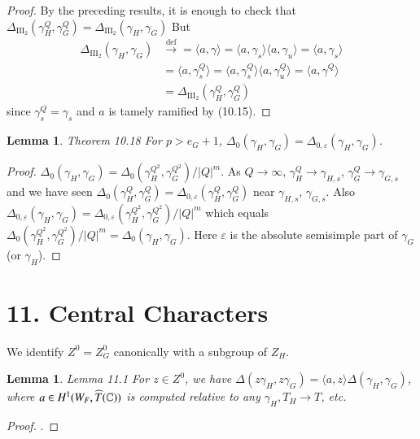 \documentclass[11pt]{amsart}
\theoremstyle{plain}
\newtheorem{lemma}[theorem]{Lemma}
\theoremstyle{definition}
\def\Com{{\Bbb C}}                         %
\def\Def{\overset{\operatorname{def}}\to=}   %
\def\varep{\varepsilon}
\def\hgam{\gamma_H}
\def\ggam{\gamma_G}
\def\LANGLANDSO{21}
\begin{document}
\begin{proof} By the preceding results, it is enough
to check that 
$\Delta_{\text{III}_2}(\gamma_H^Q,\gamma_G^Q)
= \Delta_{\text{III}_2}(\gamma_H,\gamma_G)$
But
$$
\begin{array}{lll}
\Delta_{\text{III}_2}(\gamma_H,\gamma_G)
&\Def
\langle a,\gamma\rangle =\langle a,\gamma_s\rangle
\langle a,\gamma_u\rangle = \langle a,\gamma_s\rangle\\
&=\langle a,\gamma_s^Q\rangle =\langle a,\gamma_s^Q\rangle
\langle a,\gamma_u^Q\rangle = \langle a,\gamma^Q\rangle\\
&=\Delta_{\text{III}_2}(\gamma_H^Q,\gamma_G^Q)
\end{array}
$$
since $\gamma_s^Q=\gamma_s$ and $a$ is tamely ramified by (10.15).
\end{proof}

\begin{lemma}{Theorem 10.18}  For $p > e_G+1$, $\Delta_0(\gamma_H,
\gamma_G) = \Delta_{0,\varep}(	\gamma_H,\gamma_G)$.
\end{lemma}

\begin{proof} $\Delta_0(\gamma_H,\gamma_G) =
{\Delta_0(\gamma_H^{Q^2},\gamma_G^{Q^2})}/{|Q|^m}$.
As $Q\to\infty$, $\gamma_H^Q\to \gamma_{H,s}$,
$\gamma_G^Q\to \gamma_{G,s}$ and we have seen
$\Delta_0(\gamma_H^Q,\gamma_G^Q) =\Delta_{0,\varep}(\gamma_H^Q,\gamma_G^Q)$
near $\gamma_{H,s}$, $\gamma_{G,s}$.  Also
$\Delta_{0,\varep}(\gamma_H,\gamma_G)
={\Delta_{0,\varep}(\gamma_H^{Q^2},\gamma_G^{Q^2})}/{|Q|^m}$
which equals
${\Delta_0(\gamma_H^{Q^2},\gamma_G^{Q^2})}/{|Q|^m}
= \Delta_0(\gamma_H,\gamma_G)$.  Here $\varep$ is the absolute 
semisimple part of $\gamma_G$ (or $\gamma_H$).
\end{proof}




\section{11. Central Characters}

We identify $Z^0 = Z^0_G$ canonically with a subgroup of
$Z_H$.
\begin{lemma}{Lemma 11.1} For $z\in Z^0$, we have $\Delta(z\hgam,z\ggam)
=\langle a,z\rangle\Delta(\hgam,\ggam)$,
 where $a\in H^1(W_F,\widehat T(\Com))$ is computed
relative to any $\hgam,T_H\to T$, etc.
\end{lemma}

\begin{proof}  \cite{\LANGLANDSO}.\end{proof}
\end{document}
